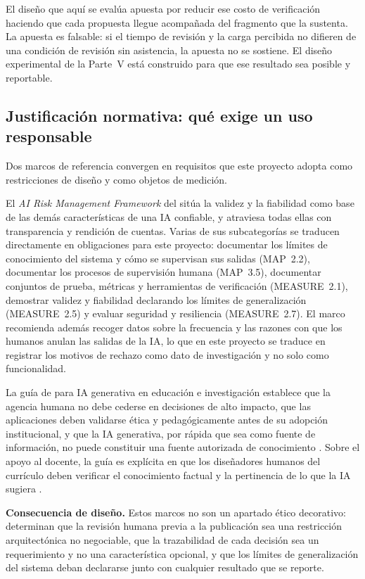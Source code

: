 El diseño que aquí se evalúa apuesta por reducir ese costo de verificación haciendo
que cada propuesta llegue acompañada del fragmento que la sustenta. La apuesta es
falsable: si el tiempo de revisión y la carga percibida no difieren de una condición
de revisión sin asistencia, la apuesta no se sostiene. El diseño experimental de la
Parte~V está construido para que ese resultado sea posible y reportable.

\subsection{Justificación normativa: qué exige un uso responsable}
\label{sec:just-normativa}

Dos marcos de referencia convergen en requisitos que este proyecto adopta como
restricciones de diseño y como objetos de medición.

El \emph{AI Risk Management Framework} del \textcite{nist2023airmf} sitúa la validez
y la fiabilidad como base de las demás características de una IA confiable, y
atraviesa todas ellas con transparencia y rendición de cuentas. Varias de sus
subcategorías se traducen directamente en obligaciones para este proyecto: documentar
los límites de conocimiento del sistema y cómo se supervisan sus salidas (MAP~2.2),
documentar los procesos de supervisión humana (MAP~3.5), documentar conjuntos de
prueba, métricas y herramientas de verificación (MEASURE~2.1), demostrar validez y
fiabilidad declarando los límites de generalización (MEASURE~2.5) y evaluar seguridad
y resiliencia (MEASURE~2.7). El marco recomienda además recoger datos sobre la
frecuencia y las razones con que los humanos anulan las salidas de la IA, lo que en
este proyecto se traduce en registrar los motivos de rechazo como dato de
investigación y no solo como funcionalidad.

La guía de \textcite{miao2023guidance} para IA generativa en educación e
investigación establece que la agencia humana no debe cederse en decisiones de alto
impacto, que las aplicaciones deben validarse ética y pedagógicamente antes de su
adopción institucional, y que la IA generativa, por rápida que sea como fuente de
información, no puede constituir una fuente autorizada de conocimiento
\parencite[p.~26]{miao2023guidance}. Sobre el apoyo al docente, la guía es explícita
en que los diseñadores humanos del currículo deben verificar el conocimiento factual
y la pertinencia de lo que la IA sugiera \parencite[p.~31]{miao2023guidance}.

\begin{estado}
\small
\textbf{Consecuencia de diseño.} Estos marcos no son un apartado ético decorativo:
determinan que la revisión humana previa a la publicación sea una restricción
arquitectónica no negociable, que la trazabilidad de cada decisión sea un
requerimiento y no una característica opcional, y que los límites de generalización
del sistema deban declararse junto con cualquier resultado que se reporte.
\end{estado}

